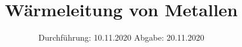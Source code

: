 

\subject{V204}
\title{Wärmeleitung von Metallen}
\date{%
  Durchführung: 10.11.2020
  \hspace{3em}
  Abgabe: 20.11.2020
}



\maketitle
\thispagestyle{empty}
\tableofcontents
\newpage






\printbibliography{}


